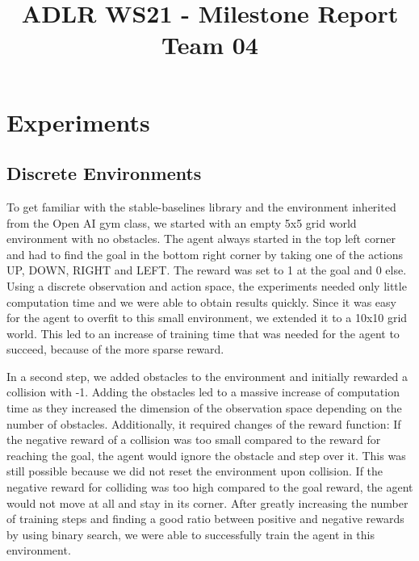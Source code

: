 \documentclass[conference]{IEEEtran}
\begin{document}
\title{ADLR WS21 - Milestone Report Team 04\\
}

\author{
\and
{}
}

\maketitle

\section{Experiments}

\subsection{Discrete Environments}

To get familiar with the stable-baselines library and the environment inherited from the Open AI gym class, we started with an empty 5x5 grid world environment with no obstacles. The agent always started in the top left corner and had to find the goal in the bottom right corner by taking one of the actions UP, DOWN, RIGHT and LEFT. The reward was set to 1 at the goal and 0 else. Using a discrete observation and action space, the experiments needed only little computation time and we were able to obtain results quickly. Since it was easy for the agent to overfit to this small environment, we extended it to a 10x10 grid world. This led to an increase of training time that was needed for the agent to succeed, because of the more sparse reward. 

In a second step, we added obstacles to the environment and initially rewarded a collision with -1. Adding the obstacles led to a massive increase of computation time as they increased the dimension of the observation space depending on the number of obstacles. Additionally, it required changes of the reward function: If the negative reward of a collision was too small compared to the reward for reaching the goal, the agent would ignore the obstacle and step over it. This was still possible because we did not reset the environment upon collision. If the negative reward for colliding was too high compared to the goal reward, the agent would not move at all and stay in its corner. After greatly increasing the number of training steps and finding a good ratio between positive and negative rewards by using binary search, we were able to successfully train the agent in this environment.
\end{document}
